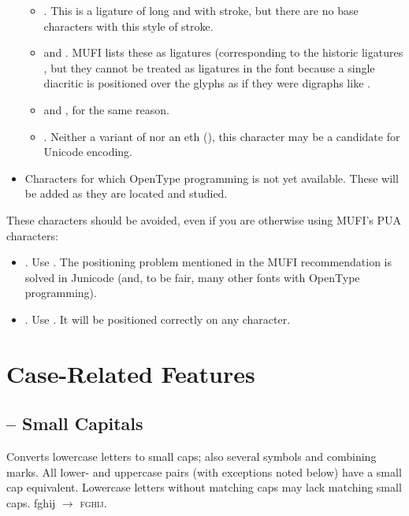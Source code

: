 \begin{itemize}
\begin{itemize}
\item {} . This is a ligature of long  and  with stroke,
but there are no base characters with this style of stroke.
\item {}  and . MUFI lists these as ligatures (corresponding to the
historic ligatures , but they cannot be treated as ligatures in the
font because a single diacritic is positioned over the glyphs as if they were digraphs like
.
\item {}  and , for the same reason.
\item {}  . Neither a variant of
 nor an eth (), this character may be a candidate for Unicode
encoding.
\end{itemize}
\item Characters for which OpenType programming is not yet available. These will be added as they are located and
studied.%
\end{itemize}
These characters should be avoided, even if you are otherwise using MUFI’s PUA characters:

\liststyleLii
\begin{itemize}
\item {} . Use  . The
positioning problem mentioned in the MUFI recommendation is solved in Junicode (and, to be fair, many other fonts with
OpenType programming).
\item {} . Use  . It
will be positioned correctly on any character.
\end{itemize}

\section{Case-Related Features}
\subsection{ -- Small Capitals}
Converts lowercase letters to small caps; also several symbols and combining marks. All lower- and uppercase pairs (with
exceptions noted below) have a small cap equivalent. Lowercase letters without matching caps may lack matching small
caps. fghij $\rightarrow $ \textsc{fghij}.

